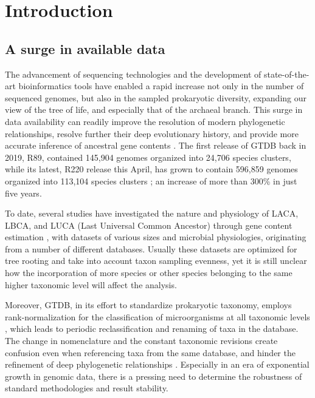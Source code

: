\section{Introduction}
\normalsize

\subsection*{A surge in available data}

The advancement of sequencing technologies and the development of state-of-the-art bioinformatics tools have enabled a rapid increase not only in the number of sequenced genomes, but also in the sampled prokaryotic diversity, expanding our view of the tree of life, and especially that of the archaeal branch. This surge in data availability can readily improve the resolution of modern phylogenetic relationships, resolve further their deep evolutionary history, and provide more accurate inference of ancestral gene contents \cite{tahon2021}. The first release of GTDB back in 2019, R89, contained 145,904 genomes organized into 24,706 species clusters, while its latest, R220 release this April, has grown to contain 596,859 genomes organized into 113,104 species clusters \cite{parks2018, parks2020, parks2022, rinke2021}; an increase of more than 300\% in just five years.

To date, several studies have investigated the nature and physiology of LACA, LBCA, and LUCA (Last Universal Common Ancestor) through gene content estimation \cite{williams2017, xavier2021, moody2024, coleman2021}, with datasets of various sizes and microbial physiologies, originating from a number of different databases. Usually these datasets are optimized for tree rooting and take into account taxon sampling evenness, yet it is still unclear how the incorporation of more species or other species belonging to the same higher taxonomic level will affect the analysis.
 
Moreover, GTDB, in its effort to standardize prokaryotic taxonomy, employs rank-normalization for the classification of microorganisms at all taxonomic levels \cite{parks2018}, which leads to periodic reclassification and renaming of taxa in the database. The change in nomenclature and the constant taxonomic revisions create confusion even when referencing taxa from the same database, and hinder the refinement of deep phylogenetic relationships \cite{tahon2021}. Especially in an era of exponential growth in genomic data, there is a pressing need to determine the robustness of standard methodologies and result stability.



